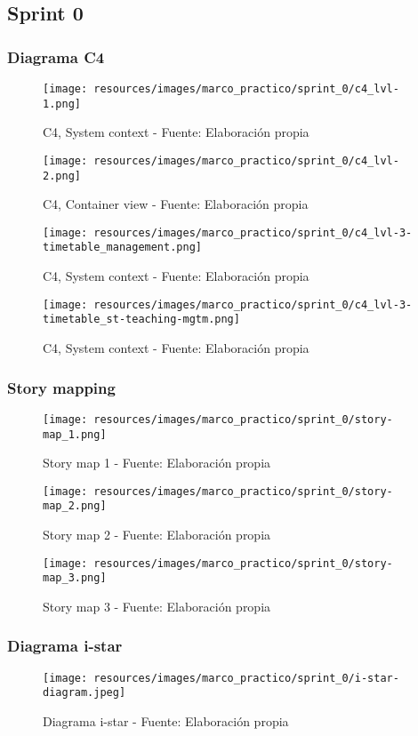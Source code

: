 \subsection{Sprint 0}

\subsubsection{Diagrama C4}
\begin{figure}[H]
    \centering
    \texttt{[image: resources/images/marco\_practico/sprint\_0/c4\_lvl-1.png]}
    \caption{C4, System context - Fuente: Elaboración propia}
    \label{fig:c4_lvl_1}
\end{figure}
\begin{figure}[H]
    \centering
    \texttt{[image: resources/images/marco\_practico/sprint\_0/c4\_lvl-2.png]}
    \caption{C4, Container view - Fuente: Elaboración propia}
    \label{fig:c4_lvl_2}
\end{figure}
\begin{figure}[H]
    \centering
    \texttt{[image: resources/images/marco\_practico/sprint\_0/c4\_lvl-3-timetable\_management.png]}
    \caption{C4, System context - Fuente: Elaboración propia}
    \label{fig:c4_lvl_3a}
\end{figure}
\begin{figure}[H]
    \centering
    \texttt{[image: resources/images/marco\_practico/sprint\_0/c4\_lvl-3-timetable\_st-teaching-mgtm.png]}
    \caption{C4, System context - Fuente: Elaboración propia}
    \label{fig:c4_lvl_3b}
\end{figure}

\subsubsection{Story mapping}
\begin{figure}[H]
    \centering
    \texttt{[image: resources/images/marco\_practico/sprint\_0/story-map\_1.png]}
    \caption{Story map 1 - Fuente: Elaboración propia}
    \label{fig:story_map_1}
\end{figure}
\begin{figure}[H]
    \centering
    \texttt{[image: resources/images/marco\_practico/sprint\_0/story-map\_2.png]}
    \caption{Story map 2 - Fuente: Elaboración propia}
    \label{fig:story_map_2}
\end{figure}
\begin{figure}[H]
    \centering
    \texttt{[image: resources/images/marco\_practico/sprint\_0/story-map\_3.png]}
    \caption{Story map 3 - Fuente: Elaboración propia}
    \label{fig:story_map_3}
\end{figure}

\subsubsection{Diagrama i-star}
\begin{figure}[H]
    \centering
    \texttt{[image: resources/images/marco\_practico/sprint\_0/i-star-diagram.jpeg]}
    \caption{Diagrama i-star - Fuente: Elaboración propia}
    \label{fig:i-star}
\end{figure}